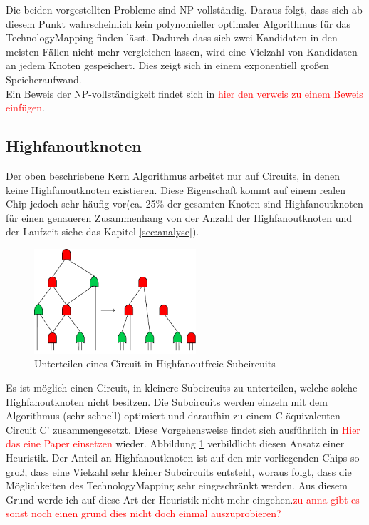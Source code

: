 \documentclass[11pt, a4paper, german]{article}
\newcommand{\TM}{TechnologyMapping }
\begin{document}
Die beiden vorgestellten Probleme sind NP-vollständig. Daraus folgt, dass sich ab diesem Punkt wahrscheinlich  kein polynomieller optimaler Algorithmus für das \TM finden lässt. Dadurch dass sich zwei Kandidaten in den meisten Fällen nicht mehr vergleichen lassen, wird eine Vielzahl von Kandidaten an jedem Knoten gespeichert. Dies zeigt sich in einem exponentiell großen Speicheraufwand. \\
Ein Beweis der NP-vollständigkeit findet sich in \textcolor{red}{hier den verweis zu einem Beweis einfügen}.

\subsection{Highfanoutknoten}
\label{subsec:highfanout}
Der oben beschriebene Kern Algorithmus arbeitet nur auf Circuits, in denen keine Highfanoutknoten existieren. Diese Eigenschaft kommt auf einem realen Chip jedoch sehr häufig vor(ca. 25\% der gesamten Knoten sind Highfanoutknoten für einen genaueren Zusammenhang von der Anzahl der Highfanoutknoten und der Laufzeit siehe das Kapitel \ref{sec:analyse}).\\
 \begin{figure}
		\includegraphics[width = 6cm]{pictures/compiled/ohne_highfanout_heu}
		\caption{Unterteilen eines Circuit in Highfanoutfreie Subcircuits}
		\label{bild:ohne_highfanout_heu}
\end{figure}
 Es ist möglich einen Circuit, in kleinere Subcircuits zu unterteilen, welche solche Highfanoutknoten nicht besitzen. Die Subcircuits werden einzeln mit dem Algorithmus (sehr schnell) optimiert und daraufhin zu einem C äquivalenten Circuit C' zusammengesetzt. Diese Vorgehensweise findet sich ausführlich in \textcolor{red}{Hier das eine Paper einsetzen} wieder. Abbildung \ref{bild:ohne_highfanout_heu} verbildlicht diesen Ansatz einer Heuristik. 
  Der Anteil an Highfanoutknoten ist auf den mir vorliegenden Chips so groß, dass eine Vielzahl sehr kleiner Subcircuits entsteht, woraus folgt, dass die Möglichkeiten des \TM sehr eingeschränkt werden. Aus diesem Grund werde ich auf diese Art der   Heuristik nicht mehr eingehen.\textcolor{red}{zu anna gibt es sonst noch einen grund dies nicht doch einmal auszuprobieren?}\\
\end{document}
